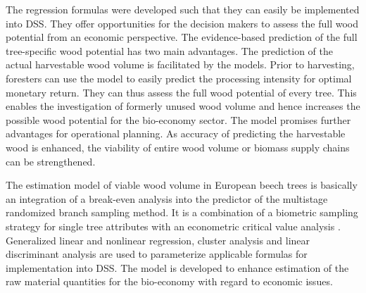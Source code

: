 The regression formulas were developed such that they can easily be implemented into DSS. They offer opportunities for the decision makers to assess the full wood potential from an economic perspective. The evidence-based prediction of the full tree-specific wood potential has two main advantages. The prediction of the actual harvestable wood volume is facilitated by the models. Prior to harvesting, foresters can use the model to easily predict the processing intensity for optimal monetary return. They can thus assess the full wood potential of every tree. This enables the investigation of formerly unused wood volume and hence increases the possible wood potential for the bio-economy sector. The model promises further advantages for operational planning. As accuracy of predicting the harvestable wood is enhanced, the viability of entire wood volume or biomass supply chains can be strengthened.

The estimation model of viable wood volume in European beech trees is basically an integration of a break-even analysis into the predictor of the multistage randomized branch sampling method. It is a combination of a biometric sampling strategy for single tree attributes \citep[p. 405]{Gregoire_2008} with an econometric critical value analysis \citep[p. 46]{mushoff_2013}. Generalized linear and nonlinear regression, cluster analysis and linear discriminant analysis are used to parameterize applicable formulas for implementation into DSS. The model is developed to enhance estimation of the raw material quantities for the bio-economy with regard to economic issues.

